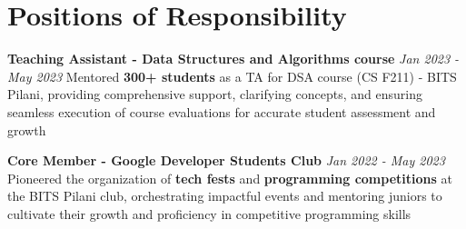\documentclass[a4paper,11pt]{article}
\newcommand{\resumeSubHeadingListStart}{\begin{itemize}[leftmargin=*,labelsep=0mm,itemsep=-2.5mm]}
\newcommand{\resumeSubHeadingListEnd}{\end{itemize}\vspace{-2mm}}
\begin{document}
{\vspace{-1mm}
\section{Positions of Responsibility}
\vspace{0.2mm}

\resumeSubHeadingListStart

\small{

\textbf{Teaching Assistant - Data Structures and Algorithms course} \hfill \textit{Jan 2023 - May 2023}
\newline
Mentored \textbf{300+ students} as a TA for DSA course (CS F211) - BITS Pilani, providing comprehensive support, clarifying concepts, and ensuring seamless execution of course evaluations for accurate student assessment and growth
\vspace{2mm}
\newline

\textbf{Core Member - Google Developer Students Club} \hfill \textit{Jan 2022 - May 2023}
\newline
Pioneered the organization of \textbf{tech fests} and \textbf{programming competitions} at the BITS Pilani club, orchestrating impactful events and mentoring juniors to cultivate their growth and proficiency in competitive programming skills
\newline
}
\vspace{-8.5mm}

\resumeSubHeadingListEnd









}
\end{document}
